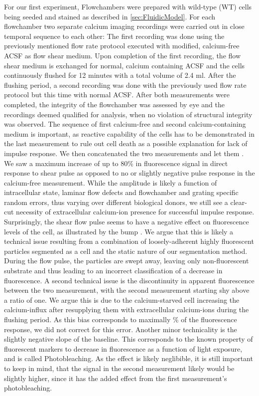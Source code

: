 For our first experiment, Flowchambers were prepared with wild-type (WT) cells being seeded and stained as described in \vref{sec:FluidicModel}. For each flowchamber two separate calcium imaging recordings were carried out in close temporal sequence to each other: The first recording was done using the previously mentioned flow rate protocol executed with modified, calcium-free ACSF as flow shear medium. Upon completion of the first recording, the flow shear medium is exchanged for normal, calcium containing ACSF and the cells continuously flushed for 12 minutes with a total volume of 2.4 ml. After the flushing period, a second recording was done with the previously used flow rate protocol but this time with normal ACSF. After both measurements were completed, the integrity of the flowchamber was assessed by eye and the recordings deemed qualified for analysis, when no violation of structural integrity was observed. The sequence of first calcium-free and second calcium-containing medium is important, as reactive capability of the cells has to be demonstrated in the last measurement to rule out cell death as a possible explanation for lack of impulse response. We then concatenated the two measurements and let them . We saw a maximum increase of up to 80\% in fluorescence signal in direct response to shear pulse as opposed to no or slightly negative pulse response in the calcium-free measurement. While the amplitude is likely a function of intracellular state, laminar flow defects and flowchamber and grating specific random errors, thus varying over different biological donors, we still see a clear-cut necessity of extracellular calcium-ion presence for successful impulse response. Surprisingly, the shear flow pulse seems to have a negative effect on fluorescence levels of the cell, as illustrated by the bump . We argue that this is likely a technical issue resulting from a combination of loosely-adherent highly fluorescent particles segmented as a cell and the static nature of our segmentation method. During the flow pulse, the particles are swept away, leaving only non-fluorescent substrate and thus leading to an incorrect classification of a decrease in fluorescence. A second technical issue is the discontinuity in apparent fluorescence between the two measurement, with the second measurement starting shy above a ratio of one. We argue this is due to the calcium-starved cell increasing the calcium-influx after resupplying them with extracellular calcium-ions during the flushing period. As this bias corresponds to maximally \% of the fluorescence response, we did not correct for this error. Another minor technicality is the slightly negative slope of the baseline. This corresponds to the known property of fluorescent markers to decrease in fluorescence as a function of light exposure, and is called Photobleaching. As the effect is likely neglibible, it is still important to keep in mind, that the signal in the second measurement likely would be slightly higher, since it has the added effect from the first measurement's photobleaching.

